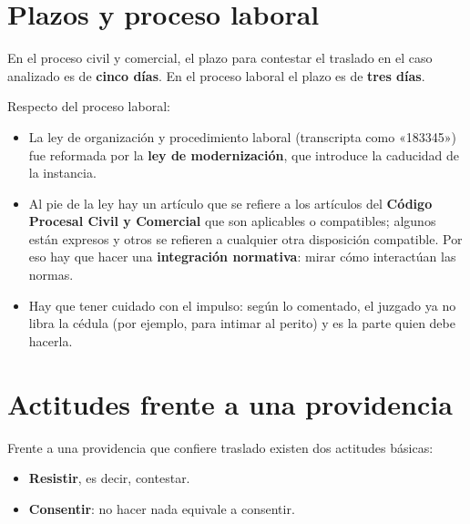 \documentclass[12pt,oneside]{book}
\begin{document}
\section{Plazos y proceso laboral}

En el proceso civil y comercial, el plazo para contestar el traslado en el caso analizado es de \textbf{cinco días}. En el proceso laboral el plazo es de \textbf{tres días}.

Respecto del proceso laboral:

\begin{itemize}
    \item La ley de organización y procedimiento laboral (transcripta como «183345») fue reformada por la \textbf{ley de modernización}, que introduce la caducidad de la instancia.
    \item Al pie de la ley hay un artículo que se refiere a los artículos del \textbf{Código Procesal Civil y Comercial} que son aplicables o compatibles; algunos están expresos y otros se refieren a cualquier otra disposición compatible. Por eso hay que hacer una \textbf{integración normativa}: mirar cómo interactúan las normas.
    \item Hay que tener cuidado con el impulso: según lo comentado, el juzgado ya no libra la cédula (por ejemplo, para intimar al perito) y es la parte quien debe hacerla.
\end{itemize}

\section{Actitudes frente a una providencia}

Frente a una providencia que confiere traslado existen dos actitudes básicas:

\begin{itemize}
    \item \textbf{Resistir}, es decir, contestar.
    \item \textbf{Consentir}: no hacer nada equivale a consentir.
\end{itemize}
\end{document}

